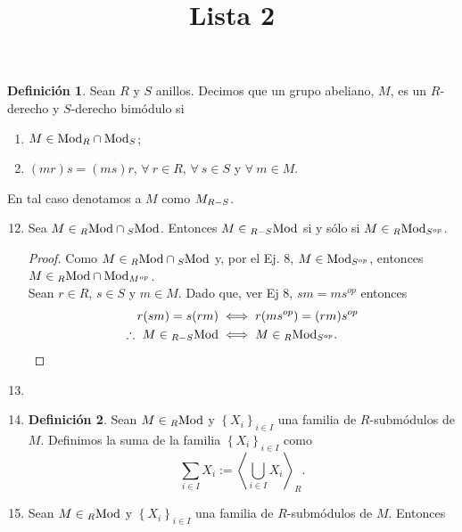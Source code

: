\documentclass{article}
\title{Lista 2}
\author{}
\date{}
\newcommand{\arbtfam}[3]{
	{\left\{{#1}_{#2}\right\}}_{#2\in #3}
}
\newcommand{\gengroup}[1]{
	\left< #1\right>
}
\newcommand{\opst}[1]{
	{#1}^{op}
}
\newcommand{\ringmod}[3]{
	\if#3l
	{}_{#1}#2
	\else
	\if#3r
	#2_{#1}
	\fi
	\fi
}
\newcommand{\ringbimod}[4]{
	\if#4l
	{}_{#1-#2}#3
	\else
	\if#4r
	#3_{#1-#2}
	\else 
	\ifstrequal{#4}{lr}{
		{}_{#1}#3_{#2}
	}
	\fi
	\fi
}
\theoremstyle{definition}
\newtheorem{define}{Definición}
\theoremstyle{plain}
\theoremstyle{plain}
\theoremstyle{definition}
\theoremstyle{definition}
\theoremstyle{definition}
\theoremstyle{definition}
\theoremstyle{definition}
\theoremstyle{definition}
\begin{document}
	
	\maketitle
\begin{define}
	Sean $R$ y $S$ anillos. Decimos que un grupo abeliano, $M$, es un $R$-derecho y $S$-derecho bimódulo si
	\begin{enumerate}[label=\roman*)]
		\item $M\in\ringmod{R}{\text{Mod}}{r}\cap\ringmod{S}{\text{Mod}}{r}$;
		\item $(mr)s=(ms)r$, $\forall\ r\in R$, $\forall\ s\in S$ y $\forall\ m\in M$.
	\end{enumerate}
	En tal caso denotamos a $M$ como $\ringbimod{R}{S}{M}{r}$.
\end{define}
	\begin{enumerate}[label=\textbf{Ej \arabic*.}]
		\setcounter{enumi}{11}
\item Sea $M\in\ringmod{R}{\text{Mod}}{l}\cap\ringmod{S}{\text{Mod}}{l}$. Entonces $M\in\ringbimod{R}{S}{\text{Mod}}{l}$ si y sólo si $M\in\ringbimod{R}{\opst{S}}{\text{Mod}}{lr}$.
\begin{proof}
	Como $M\in\ringmod{R}{\text{Mod}}{l}\cap\ringmod{S}{\text{Mod}}{l}$ y, por el Ej. 8, $M\in\ringmod{\opst{S}}{\text{Mod}}{r}$, entonces $M\in\ringmod{R}{\text{Mod}}{l}\cap\ringmod{\opst{M}}{\text{Mod}}{r}$.\\ Sean $r\in R$, $s\in S$ y $m\in M$. 
	Dado que, ver Ej 8, $sm=ms^{op}$ entonces 
	\begin{align*}
		r(sm)=s(rm)&\iff r(m\opst{s})=(rm)\opst{s}\\
		\therefore\  M\in\ringbimod{R}{S}{\text{Mod}}{l}&\iff M\in\ringbimod{R}{\opst{S}}{\text{Mod}}{lr}.
	\end{align*}
\end{proof}
\item\item
\begin{define}
	Sean $M\in\ringmod{R}{\text{Mod}}{l}$ y $\arbtfam{X}{i}{I}$ una familia de $R$-submódulos de $M$. Definimos la suma de la familia $\arbtfam{X}{i}{I}$ como
	\begin{equation*}
		\sum_{i\in I}X_i:=\gengroup{\bigcup_{i\in I}X_i}_R.
	\end{equation*}
\end{define}
\item Sean $M\in\ringmod{R}{\text{Mod}}{l}$ y $\arbtfam{X}{i}{I}$ una familia de $R$-submódulos de $M$. Entonces
\begin{enumerate}[label=(\alph*)]

\end{enumerate}
\end{enumerate}
\end{document}

